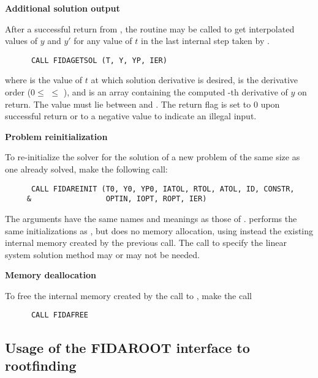 \begin{Steps}
\item {\bf Additional solution output}

  After a successful return from , the routine  may
  be called to get interpolated values of $y$ and $y'$ for any value of $t$ in
  the last internal step taken by {\ida}.
\begin{verbatim}
      CALL FIDAGETSOL (T, Y, YP, IER)
\end{verbatim}
  where
   is the value of $t$ at which solution derivative is desired,
   is the derivative order ($0 \le$  $\le$ ), and
   is an array containing the computed -th derivative of $y$
  on return.  The value  must lie between  and .
  The return flag  is set to $0$ upon successful return or to a negative
  value to indicate an illegal input.
  
\item {\bf Problem reinitialization}

  To re-initialize the {\ida} solver for the solution of a new problem
  of the same size as one already solved, make the following call:
\begin{verbatim}
      CALL FIDAREINIT (T0, Y0, YP0, IATOL, RTOL, ATOL, ID, CONSTR,
     &                 OPTIN, IOPT, ROPT, IER)
\end{verbatim}
  The arguments have the same names and meanings as those of .
   performs the same initializations as
  , but does no memory allocation, using instead the existing
  internal memory created by the previous  call.  The call to
  specify the linear system solution method may or may not be needed.

\item {\bf Memory deallocation}

  To free the internal memory created by the call to ,
  make the call
\begin{verbatim}
      CALL FIDAFREE
\end{verbatim}

\end{Steps}

\subsection{Usage of the FIDAROOT interface to rootfinding}

